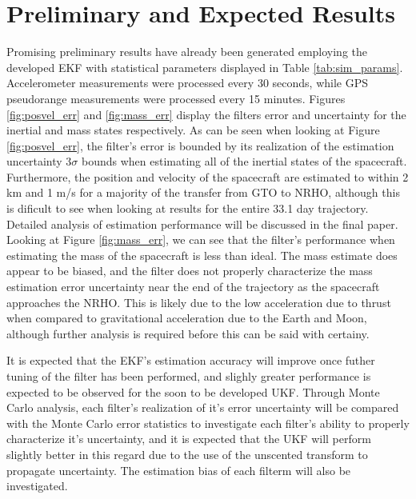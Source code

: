 \documentclass[letterpaper, submit]{AAS}			%
\begin{document}
\section{Preliminary and Expected Results}
Promising preliminary results have already been generated employing the developed EKF with statistical parameters displayed in Table \ref{tab:sim_params}. Accelerometer measurements were processed every 30 seconds, while GPS pseudorange measurements were processed every 15 minutes. Figures \ref{fig:posvel_err} and \ref{fig:mass_err} display the filters error and uncertainty for the inertial and mass states respectively. As can be seen when looking at Figure \ref{fig:posvel_err}, the filter's error is bounded by its realization of the estimation uncertainty $3\sigma$ bounds when estimating all of the inertial states of the spacecraft. Furthermore, the position and velocity of the spacecraft are estimated to within 2 km and 1 m/s for a majority of the transfer from GTO to NRHO, although this is dificult to see when looking at results for the entire 33.1 day trajectory. Detailed analysis of estimation performance will be discussed in the final paper. Looking at Figure \ref{fig:mass_err}, we can see that the filter's performance when estimating the mass of the spacecraft is less than ideal. The mass estimate does appear to be biased, and the filter does not properly characterize the mass estimation error uncertainty near the end of the trajectory as the spacecraft approaches the NRHO. This is likely due to the low acceleration due to thrust when compared to gravitational acceleration due to the Earth and Moon, although further analysis is required before this can be said with certainy. 

It is expected that the EKF's estimation accuracy will improve once futher tuning of the filter has been performed, and slighly greater performance is expected to be observed for the soon to be developed UKF. Through Monte Carlo analysis, each filter's realization of it's error uncertainty will be compared with the Monte Carlo error statistics to investigate each filter's ability to properly characterize it's uncertainty, and it is expected that the UKF will perform slightly better in this regard due to the use of the unscented transform to propagate uncertainty. The estimation bias of each filterm will also be investigated.
\end{document}
